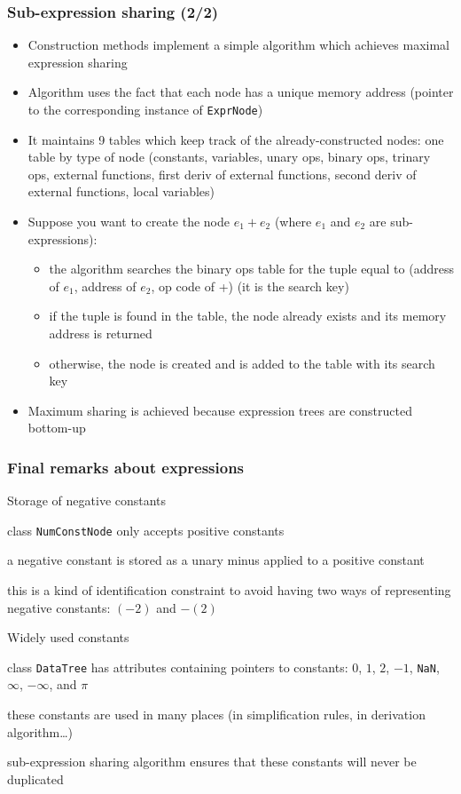 \documentclass[aspectratio=169]{beamer}
\newenvironment{witemize}{\itemize\addtolength{\itemsep}{8pt}}{\enditemize}
\begin{document}
\begin{frame}
  \frametitle{Sub-expression sharing (2/2)}
  \begin{itemize}
  \item Construction methods implement a simple algorithm which achieves maximal expression sharing
  \item Algorithm uses the fact that each node has a unique memory address (pointer to the corresponding instance of \texttt{ExprNode})
  \item It maintains 9 tables which keep track of the already-constructed nodes: one table by type of node (constants, variables, unary ops, binary ops, trinary ops, external functions, first deriv of external functions, second deriv of external functions, local variables)
  \item Suppose you want to create the node $e_1+e_2$ (where $e_1$ and $e_2$ are sub-expressions):
    \begin{itemize}
    \item the algorithm searches the binary ops table for the tuple equal to (address of $e_1$, address of $e_2$, op code of +) (it is the \alert{search key})
    \item if the tuple is found in the table, the node already exists and its memory address is returned
    \item otherwise, the node is created and is added to the table with its search key
    \end{itemize}
  \item Maximum sharing is achieved because expression trees are constructed bottom-up
  \end{itemize}
\end{frame}

\begin{frame}
  \frametitle{Final remarks about expressions}
  \begin{witemize}
  \item Storage of negative constants
    \begin{witemize}
    \item class \texttt{NumConstNode} only accepts positive constants
    \item a negative constant is stored as a unary minus applied to a positive constant
    \item this is a kind of identification constraint to avoid having two ways of representing negative constants: $(-2)$ and $-(2)$
    \end{witemize}
  \item Widely used constants
    \begin{witemize}
    \item class \texttt{DataTree} has attributes containing pointers to constants: $0$, $1$, $2$, $-1$, \texttt{NaN}, $\infty$, $-\infty$, and $\pi$
    \item these constants are used in many places (in simplification rules, in derivation algorithm\ldots)
    \item sub-expression sharing algorithm ensures that these constants will never be duplicated
    \end{witemize}
  \end{witemize}
\end{frame}
\end{document}
